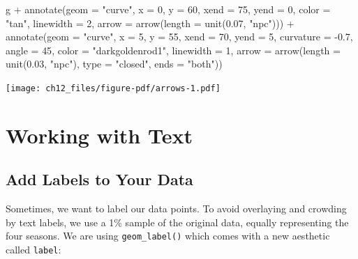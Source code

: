 \documentclass[
  letterpaper,
]{scrbook}
\newenvironment{Shaded}{\begin{snugshade}}{\end{snugshade}}
\newcommand{\AttributeTok}[1]{\textcolor[rgb]{0.40,0.45,0.13}{#1}}
\newcommand{\DecValTok}[1]{\textcolor[rgb]{0.68,0.00,0.00}{#1}}
\newcommand{\FloatTok}[1]{\textcolor[rgb]{0.68,0.00,0.00}{#1}}
\newcommand{\FunctionTok}[1]{\textcolor[rgb]{0.28,0.35,0.67}{#1}}
\newcommand{\NormalTok}[1]{\textcolor[rgb]{0.00,0.23,0.31}{#1}}
\newcommand{\SpecialCharTok}[1]{\textcolor[rgb]{0.37,0.37,0.37}{#1}}
\newcommand{\StringTok}[1]{\textcolor[rgb]{0.13,0.47,0.30}{#1}}
\begin{document}
\begin{Shaded}
\begin{Highlighting}[]
\NormalTok{g }\SpecialCharTok{+}
  \FunctionTok{annotate}\NormalTok{(}\AttributeTok{geom =} \StringTok{"curve"}\NormalTok{, }\AttributeTok{x =} \DecValTok{0}\NormalTok{, }\AttributeTok{y =} \DecValTok{60}\NormalTok{, }\AttributeTok{xend =} \DecValTok{75}\NormalTok{, }\AttributeTok{yend =} \DecValTok{0}\NormalTok{,}
             \AttributeTok{color =} \StringTok{"tan"}\NormalTok{, }\AttributeTok{linewidth =} \DecValTok{2}\NormalTok{, }
             \AttributeTok{arrow =} \FunctionTok{arrow}\NormalTok{(}\AttributeTok{length =} \FunctionTok{unit}\NormalTok{(}\FloatTok{0.07}\NormalTok{, }\StringTok{"npc"}\NormalTok{))) }\SpecialCharTok{+}
  \FunctionTok{annotate}\NormalTok{(}\AttributeTok{geom =} \StringTok{"curve"}\NormalTok{, }\AttributeTok{x =} \DecValTok{5}\NormalTok{, }\AttributeTok{y =} \DecValTok{55}\NormalTok{, }\AttributeTok{xend =} \DecValTok{70}\NormalTok{, }\AttributeTok{yend =} \DecValTok{5}\NormalTok{,}
             \AttributeTok{curvature =} \SpecialCharTok{{-}}\FloatTok{0.7}\NormalTok{, }\AttributeTok{angle =} \DecValTok{45}\NormalTok{,}
             \AttributeTok{color =} \StringTok{"darkgoldenrod1"}\NormalTok{, }\AttributeTok{linewidth =} \DecValTok{1}\NormalTok{,}
             \AttributeTok{arrow =} \FunctionTok{arrow}\NormalTok{(}\AttributeTok{length =} \FunctionTok{unit}\NormalTok{(}\FloatTok{0.03}\NormalTok{, }\StringTok{"npc"}\NormalTok{),}
                           \AttributeTok{type =} \StringTok{"closed"}\NormalTok{,}
                           \AttributeTok{ends =} \StringTok{"both"}\NormalTok{))}
\end{Highlighting}
\end{Shaded}

\texttt{[image: ch12\_files/figure-pdf/arrows-1.pdf]}


\chapter{Working with Text}\label{text}

\section{Add Labels to Your Data}\label{add-labels-to-your-data}

Sometimes, we want to label our data points. To avoid overlaying and
crowding by text labels, we use a 1\% sample of the original data,
equally representing the four seasons. We are using
\texttt{geom\_label()} which comes with a new aesthetic called
\texttt{label}:
\end{document}
